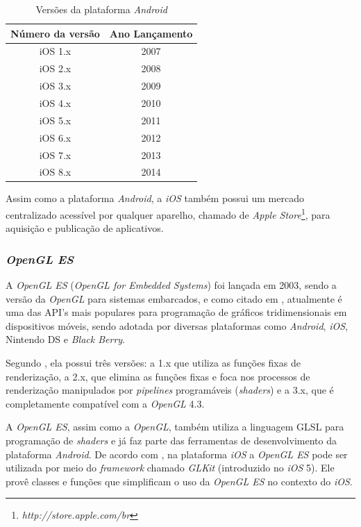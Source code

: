 	\begin{table}[ht]
	\centering	
	\begin{tabular}{cc}
		\toprule
		\textbf{Número da versão} & Ano Lançamento  \\
		\midrule
		iOS 1.x & 2007 \\
		iOS 2.x & 2008 \\
		iOS 3.x &  2009 \\
		iOS 4.x & 2010 \\
		iOS 5.x &  2011 \\
		iOS 6.x & 2012 \\
		iOS 7.x & 2013 \\
		iOS 8.x & 2014 \\	
		\bottomrule
	\end{tabular}
	\caption{ Versões da plataforma \textit{Android}}
	\label{iosv}
\end{table}

	Assim como a plataforma \textit{Android}, a \textit{iOS} também possui um mercado centralizado acessível por qualquer aparelho, chamado de \textit{Apple Store}\footnote{\textit{http://store.apple.com/br}}, para aquisição e publicação de aplicativos. 

	\subsubsection{\textit{OpenGL ES}}
	
	A \textit{OpenGL ES} (\textit{OpenGL for Embedded Systems}) foi lançada em 2003, sendo a versão da \textit{OpenGL} para sistemas embarcados, e como citado em \cite{guha2011}, atualmente é uma das API's mais populares para programação de gráficos tridimensionais em dispositivos móveis, sendo adotada por diversas plataformas como \textit{Android}, \textit{iOS}, Nintendo DS e \textit{Black Berry}.

	Segundo \cite{opengles2012}, ela possui três versões: a 1.x que utiliza as funções fixas de renderização, a 2.x, que elimina as funções fixas e foca nos processos de renderização manipulados por \textit{pipelines} programáveis (\textit{shaders}) e a 3.x, que é completamente compatível com a  \textit{OpenGL} 4.3.  

	A \textit{OpenGL ES}, assim como a \textit{OpenGL}, também utiliza a linguagem GLSL para programação de \textit{shaders} e  já faz parte das ferramentas de desenvolvimento da plataforma \textit{Android}. De acordo com \cite{buck2012}, na plataforma \textit{iOS} a \textit{OpenGL ES} pode ser utilizada por meio do \textit{framework} chamado \textit{GLKit} (introduzido no \textit{iOS} 5). Ele provê classes e funções que simplificam o uso da \textit{OpenGL ES} no contexto do \textit{iOS}.


